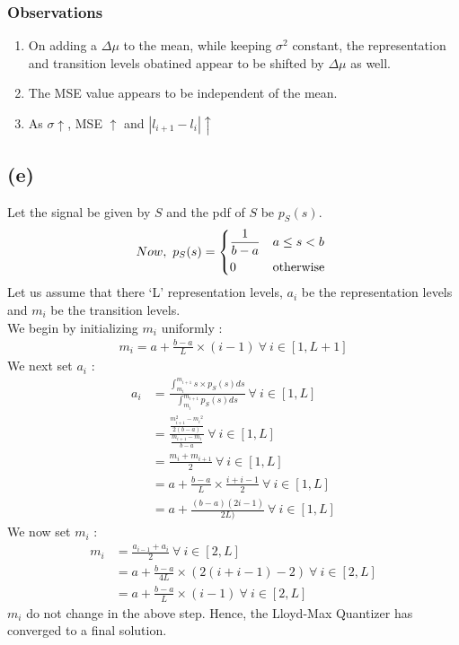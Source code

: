 \documentclass[a4paper,fleqn,11pt]{article}
\theoremstyle{mytheor}
\begin{document}
\subsubsection*{Observations}
\begin{enumerate}
\item On adding a $\Delta\mu$ to the mean, while keeping $\sigma^2$ constant, the representation and transition levels obatined appear to be shifted by $\Delta\mu$ as well.
\item The MSE value appears to be independent of the mean.
\item As $\sigma \uparrow$, MSE $\uparrow$ and $|l_{i + 1} - l_i| \uparrow$
\end{enumerate}

\subsection*{(e)}
Let the signal be given by $S$ and the pdf of $S$ be $p_S (s)$.
\begin{align*}
Now,\ p_S (s) = \begin{dcases*}
					\frac{1}{b - a}	& $a \leq s < b$\\
					0  				& otherwise
				\end{dcases*}
\end{align*}
Let us assume that there `L' representation levels, $a_i$ be the representation levels and $m_i$ be the transition levels. \\
We begin by initializing $m_i$ uniformly :
\begin{align*}
m_i = a + \frac{b - a}{L} \times (i - 1)\ \forall\ i \in [1, L + 1]
\end{align*}
We next set $a_i$ :
\begin{align*}
a_i &  = \frac{\int_{m_i}^{m_{i + 1}} s \times p_S (s) ds}{\int_{m_i}^{m_{i + 1}} p_S (s) ds}\ \forall\ i \in [1, L] \\
    & = \frac{\frac{m_{i + 1}^2 - {m_i}^2}{2(b - a)}}{\frac{m_{i + 1} - {m_i}}{b - a}}\ \forall\ i \in [1, L] \\
    & = \frac{m_i + m_{i + 1}}{2}\ \forall\ i \in [1, L] \\
    & = a + \frac{b - a}{L} \times \frac{i + i - 1}{2}\ \forall\ i \in [1, L] \\
    & = a + \frac{(b - a)(2i - 1)}{2L)}\ \forall\ i \in [1, L]
\end{align*}
We now set $m_i$ :
\begin{align*}
m_i & = \frac{a_{i - 1} + a_i}{2}\ \forall\ i \in [2, L] \\
	& = a + \frac{b - a}{4L} \times (2 (i + i - 1) - 2)\ \forall\ i \in [2, L] \\
	& = a + \frac{b - a}{L} \times (i - 1)\ \forall\ i \in [2, L]
\end{align*}
$m_i$ do not change in the above step. Hence, the Lloyd-Max Quantizer has converged to a final solution.
\end{document}
